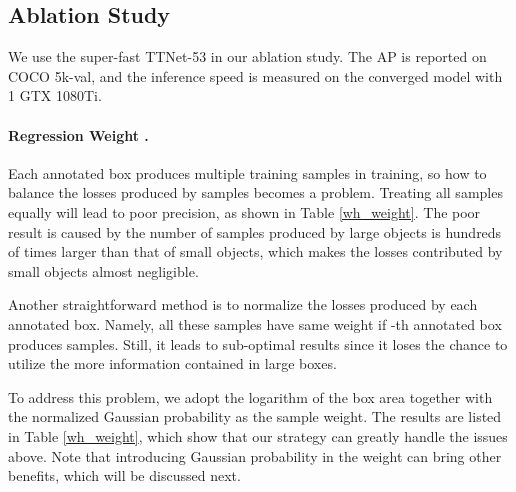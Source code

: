\documentclass[letterpaper]{article} \usepackage{aaai20}  \usepackage{times}  \usepackage{helvet} \usepackage{courier}  \usepackage[hyphens]{url}  \usepackage{graphicx} \urlstyle{rm} \def\UrlFont{\rm}  \usepackage{graphicx}  \frenchspacing  \setlength{\pdfpagewidth}{8.5in}  \setlength{\pdfpageheight}{11in}  \usepackage{subcaption}
\begin{document}
\subsection{Ablation Study}
We use the super-fast TTNet-53 in our ablation study. The AP is reported on COCO 5k-val, and the inference speed is measured on the converged model with 1 GTX 1080Ti.

\begin{table}[!tbh] 
\centering
{}
\caption{Different settings of regression weights . Norm stands for equally treating  batches of samples produced by  objects, Sqrt and Log stand for multiplying the sample weight by square root or logarithm of the box area, and Gaussian stands for using Gaussian probabilities in sample weights.  is set to 0.54 in the experiments.}
\label{wh_weight}
\end{table}

\paragraph{Regression Weight .} Each annotated box produces multiple training samples in training, so how to balance the losses produced by samples becomes a problem. Treating all samples equally will lead to poor precision, as shown in Table \ref{wh_weight}. The poor result is caused by the number of samples produced by large objects is hundreds of times larger than that of small objects, which makes the losses contributed by small objects almost negligible. 

Another straightforward method is to normalize the losses produced by each annotated box. Namely, all these samples have same weight  if -th annotated box produces  samples. Still, it leads to sub-optimal results since it loses the chance to utilize the more information contained in large boxes.

To address this problem, we adopt the logarithm of the box area together with the normalized Gaussian probability as the sample weight. The results are listed in Table \ref{wh_weight}, which show that our strategy can greatly handle the issues above. Note that introducing Gaussian probability in the weight can bring other benefits, which will be discussed next.
\end{document}
